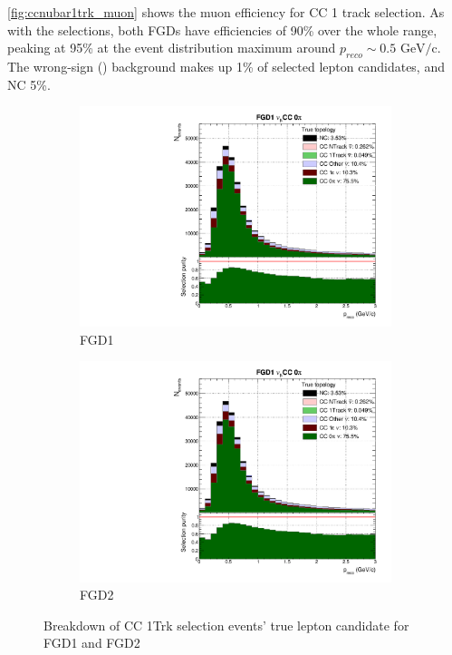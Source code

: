 \autoref{fig:ccnubar1trk_muon} shows the muon efficiency for \numubar CC 1 track selection. As with the \numu selections, both FGDs have efficiencies of 90\% over the whole range, peaking at 95\% at the event distribution maximum around $p_{reco} \sim 0.5\text{ GeV/c}$. The wrong-sign (\numubar) background makes up 1\% of selected lepton candidates, and NC 5\%.
\begin{figure}[h]
	\begin{subfigure}[t]{0.49\textwidth}
		\includegraphics[width=\textwidth,page=14, trim={0mm 0mm 0mm 9mm}, clip]{figures/mach3/selection/2017b_Diag_WithSelection}
		\caption{FGD1}
	\end{subfigure}
	\begin{subfigure}[t]{0.49\textwidth}
		\includegraphics[width=\textwidth,page=18, trim={0mm 0mm 0mm 9mm}, clip]{figures/mach3/selection/2017b_Diag_WithSelection}
		\caption{FGD2}
	\end{subfigure}
	\caption{Breakdown of \numubar CC 1Trk selection events' true lepton candidate for FGD1 and FGD2 }
	\label{fig:ccnubar1trk_muon}
\end{figure}

